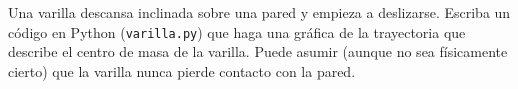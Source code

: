\documentclass[11pt,letterpaper]{exam}
\begin{document}
\begin{questions}
\begin{itemize}
\end{itemize}
 

Una varilla descansa inclinada sobre una pared y empieza a
deslizarse. Escriba un c\'odigo en Python (\verb"varilla.py") que haga
una gr\'afica de la trayectoria que describe el centro de masa de la
varilla. Puede asumir (aunque no sea f\'isicamente cierto) que la
varilla nunca pierde contacto con la pared. 

 

\end{questions}
\end{document}
